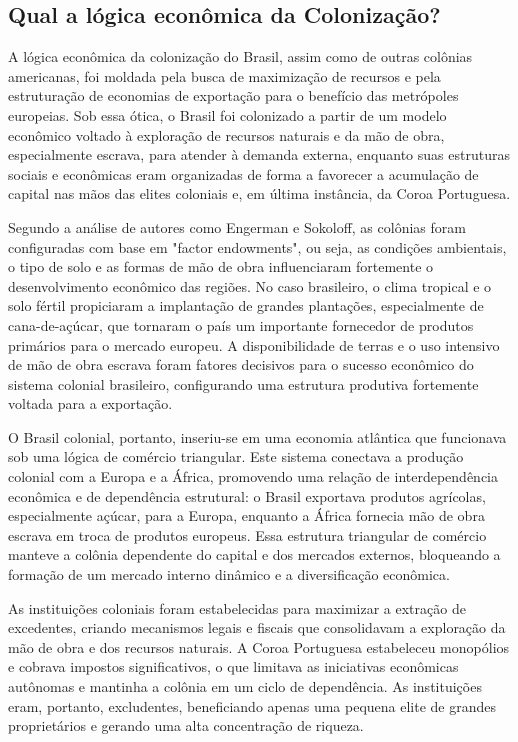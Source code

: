 \documentclass[a4paper,12pt]{article}[abntex2]
\begin{document}
\subsection{\textbf{Qual a lógica econômica da Colonização?}}

A lógica econômica da colonização do Brasil, assim como de outras colônias americanas, foi moldada pela busca de maximização de recursos e pela estruturação de economias de exportação para o benefício das metrópoles europeias. Sob essa ótica, o Brasil foi colonizado a partir de um modelo econômico voltado à exploração de recursos naturais e da mão de obra, especialmente escrava, para atender à demanda externa, enquanto suas estruturas sociais e econômicas eram organizadas de forma a favorecer a acumulação de capital nas mãos das elites coloniais e, em última instância, da Coroa Portuguesa.

Segundo a análise de autores como Engerman e Sokoloff, as colônias foram configuradas com base em "factor endowments", ou seja, as condições ambientais, o tipo de solo e as formas de mão de obra influenciaram fortemente o desenvolvimento econômico das regiões. No caso brasileiro, o clima tropical e o solo fértil propiciaram a implantação de grandes plantações, especialmente de cana-de-açúcar, que tornaram o país um importante fornecedor de produtos primários para o mercado europeu. A disponibilidade de terras e o uso intensivo de mão de obra escrava foram fatores decisivos para o sucesso econômico do sistema colonial brasileiro, configurando uma estrutura produtiva fortemente voltada para a exportação.

O Brasil colonial, portanto, inseriu-se em uma economia atlântica que funcionava sob uma lógica de comércio triangular. Este sistema conectava a produção colonial com a Europa e a África, promovendo uma relação de interdependência econômica e de dependência estrutural: o Brasil exportava produtos agrícolas, especialmente açúcar, para a Europa, enquanto a África fornecia mão de obra escrava em troca de produtos europeus. Essa estrutura triangular de comércio manteve a colônia dependente do capital e dos mercados externos, bloqueando a formação de um mercado interno dinâmico e a diversificação econômica.

As instituições coloniais foram estabelecidas para maximizar a extração de excedentes, criando mecanismos legais e fiscais que consolidavam a exploração da mão de obra e dos recursos naturais. A Coroa Portuguesa estabeleceu monopólios e cobrava impostos significativos, o que limitava as iniciativas econômicas autônomas e mantinha a colônia em um ciclo de dependência. As instituições eram, portanto, excludentes, beneficiando apenas uma pequena elite de grandes proprietários e gerando uma alta concentração de riqueza.
\end{document}
